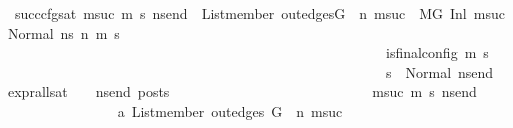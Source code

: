 \begin{isabellebody}
\ succ{\isacharunderscore}{\kern0pt}cfg{\isacharunderscore}{\kern0pt}sat{\isacharcolon}{\kern0pt}\ {\isachardoublequoteopen}{\isasymAnd}msuc{}\ m{\isacharprime}{\kern0pt}\ s{\isacharprime}{\kern0pt}\ ns{\isacharunderscore}{\kern0pt}end{\isachardot}{\kern0pt}\ \ List{\isachardot}{\kern0pt}member\ {\isacharparenleft}{\kern0pt}out{\isacharunderscore}{\kern0pt}edges{\isacharparenleft}{\kern0pt}G{\isacharparenright}{\kern0pt}\ {\isacharbang}{\kern0pt}\ n{\isacharparenright}{\kern0pt}\ msuc{}\ {\isasymLongrightarrow}\ {\isacharparenleft}{\kern0pt}M{\isacharcomma}{\kern0pt}{\isasymLambda}{\isacharcomma}{\kern0pt}{\isasymGamma}{\isacharcomma}{\kern0pt}{\isasymOmega}{\isacharcomma}{\kern0pt}G\ {\isasymturnstile}{\isacharparenleft}{\kern0pt}Inl\ {\isacharparenleft}{\kern0pt}msuc{}{\isacharparenright}{\kern0pt}{\isacharcomma}{\kern0pt}\ Normal\ ns{}{\isacharparenright}{\kern0pt}\ {\isacharminus}{\kern0pt}n{\isasymrightarrow}{\isacharasterisk}{\kern0pt}\ {\isacharparenleft}{\kern0pt}m{\isacharprime}{\kern0pt}{\isacharcomma}{\kern0pt}\ s{\isacharprime}{\kern0pt}{\isacharparenright}{\kern0pt}{\isacharparenright}{\kern0pt}\ {\isasymLongrightarrow}\isanewline
\ \ \ \ \ \ \ \ \ \ \ \ \ \ \ \ \ \ \ \ \ \ \ \ \ \ \ \ \ \ \ \ \ \ \ \ \ \ \ \ \ \ \ \ \ \ \ \ \ \ \ \ \ \ is{\isacharunderscore}{\kern0pt}final{\isacharunderscore}{\kern0pt}config\ {\isacharparenleft}{\kern0pt}m{\isacharprime}{\kern0pt}{\isacharcomma}{\kern0pt}\ s{\isacharprime}{\kern0pt}{\isacharparenright}{\kern0pt}\ {\isasymLongrightarrow}\ \isanewline
\ \ \ \ \ \ \ \ \ \ \ \ \ \ \ \ \ \ \ \ \ \ \ \ \ \ \ \ \ \ \ \ \ \ \ \ \ \ \ \ \ \ \ \ \ \ \ \ \ \ \ \ \ \ {\isacharparenleft}{\kern0pt}s{\isacharprime}{\kern0pt}\ {\isacharequal}{\kern0pt}\ Normal\ ns{\isacharunderscore}{\kern0pt}end{\isacharparenright}{\kern0pt}\ {\isasymlongrightarrow}\ {\isacharparenleft}{\kern0pt}expr{\isacharunderscore}{\kern0pt}all{\isacharunderscore}{\kern0pt}sat\ {\isasymLambda}\ {\isasymGamma}\ {\isasymOmega}\ ns{\isacharunderscore}{\kern0pt}end{\isacharparenright}{\kern0pt}\ posts{\isachardoublequoteclose}\isanewline
\ \ \ \ \ \ \ \ \ \ \ \ \isamarkupfalse%
\isanewline
\ \ \ \ \ \ \ \ \ \ \ \ \ \ \isamarkupfalse%
\ msuc{}\ m{\isacharprime}{\kern0pt}\ s{\isacharprime}{\kern0pt}\ ns{\isacharunderscore}{\kern0pt}end\isanewline
\ \ \ \ \ \ \ \ \ \ \ \ \ \ \isamarkupfalse%
\ a{\isacharcolon}{\kern0pt}\ {\isachardoublequoteopen}List{\isachardot}{\kern0pt}member\ {\isacharparenleft}{\kern0pt}out{\isacharunderscore}{\kern0pt}edges\ G\ {\isacharbang}{\kern0pt}\ n{\isacharparenright}{\kern0pt}\ msuc{}{\isachardoublequoteclose}\ \isanewline

\end{isabellebody}
